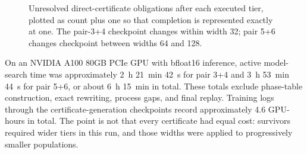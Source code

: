 \begin{figure}[t]
\centering
\begin{minipage}{0.49\linewidth}
\centering
{}
\end{minipage}\hfill
\begin{minipage}{0.49\linewidth}
\centering
{}
\end{minipage}
\caption{Unresolved direct-certificate obligations after each executed tier,
plotted as count plus one so that completion is represented exactly at one.
The pair-3+4 checkpoint changes within width 32; pair 5+6 changes checkpoint
between widths 64 and 128.}
\label{fig:survivor-curves}
\end{figure}

On an NVIDIA A100 80GB PCIe GPU with bfloat16 inference, active model-search
time was approximately 2~h 21~min 42~s for pair 3+4 and 3~h 53~min 44~s for
pair 5+6, or about 6~h 15~min in total.  These totals exclude phase-table
construction, exact rewriting, process gaps, and final replay.  Training logs
through the certificate-generation checkpoints record approximately 4.6
GPU-hours in total.  The point is not that every certificate had equal cost:
survivors required wider tiers in this run, and those widths were applied to
progressively smaller populations.

